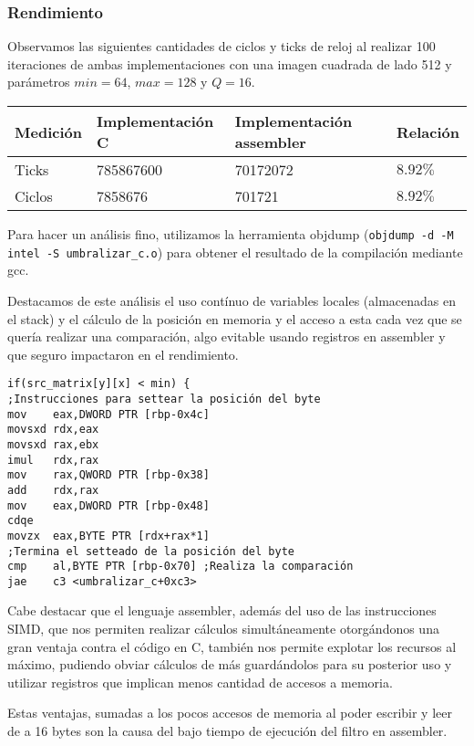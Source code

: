 \subsubsection{Rendimiento}
Observamos las siguientes cantidades de ciclos y ticks de reloj al realizar 100 iteraciones de ambas implementaciones con una imagen cuadrada de lado 512 y parámetros $min = 64$, $max = 128$ y $Q = 16$.
\begin{center}
    \begin{tabular}{|l|l|l|l|}
        \hline
        Medición & Implementación C & Implementación assembler & Relación \\
        \hline
        Ticks    & 785867600      & 70172072               & $8.92\%$ \\
        Ciclos   & 7858676        & 701721                & $8.92\%$ \\
        \hline
    \end{tabular}
\end{center}

Para hacer un análisis fino, utilizamos la herramienta objdump (\texttt{objdump -d -M intel -S umbralizar\_c.o}) para obtener el resultado de la compilación mediante gcc.

Destacamos de este análisis el uso contínuo de variables locales (almacenadas en el stack) y el cálculo de la posición en memoria y el acceso a esta cada vez que se quería realizar una comparación, algo evitable usando registros en assembler y que seguro impactaron en el rendimiento.

\begin{verbatim}
if(src_matrix[y][x] < min) {
;Instrucciones para settear la posición del byte
mov    eax,DWORD PTR [rbp-0x4c]
movsxd rdx,eax
movsxd rax,ebx
imul   rdx,rax
mov    rax,QWORD PTR [rbp-0x38]
add    rdx,rax
mov    eax,DWORD PTR [rbp-0x48]
cdqe   
movzx  eax,BYTE PTR [rdx+rax*1]
;Termina el setteado de la posición del byte
cmp    al,BYTE PTR [rbp-0x70] ;Realiza la comparación
jae    c3 <umbralizar_c+0xc3>
\end{verbatim}

Cabe destacar que el lenguaje assembler, además del uso de las instrucciones SIMD, que nos permiten realizar cálculos simultáneamente otorgándonos una gran ventaja contra el código en C, también nos permite explotar los recursos al máximo, pudiendo obviar cálculos de más guardándolos para su posterior uso y utilizar registros que implican menos cantidad de accesos a memoria.

Estas ventajas, sumadas a los pocos accesos de memoria al poder escribir y leer de a 16 bytes son la causa del bajo tiempo de ejecución del filtro en assembler.
